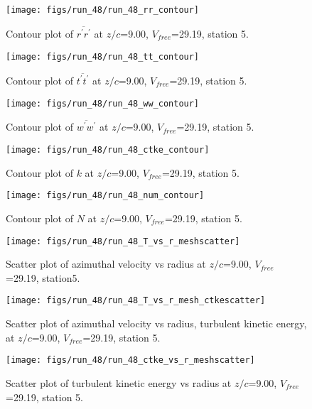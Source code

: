 \begin{figure}[H]
\centering
\texttt{[image: figs/run\_48/run\_48\_rr\_contour]}
\caption{Contour plot of $\overline{r^\prime r^\prime}$ at $z/c$=9.00, $V_{free}$=29.19, station 5.}
\label{fig:run_48_rr_contour}
\end{figure}


\begin{figure}[H]
\centering
\texttt{[image: figs/run\_48/run\_48\_tt\_contour]}
\caption{Contour plot of $\overline{t^\prime t^\prime}$ at $z/c$=9.00, $V_{free}$=29.19, station 5.}
\label{fig:run_48_tt_contour}
\end{figure}


\begin{figure}[H]
\centering
\texttt{[image: figs/run\_48/run\_48\_ww\_contour]}
\caption{Contour plot of $\overline{w^\prime w^\prime}$ at $z/c$=9.00, $V_{free}$=29.19, station 5.}
\label{fig:run_48_ww_contour}
\end{figure}


\begin{figure}[H]
\centering
\texttt{[image: figs/run\_48/run\_48\_ctke\_contour]}
\caption{Contour plot of $k$ at $z/c$=9.00, $V_{free}$=29.19, station 5.}
\label{fig:run_48_ctke_contour}
\end{figure}


\begin{figure}[H]
\centering
\texttt{[image: figs/run\_48/run\_48\_num\_contour]}
\caption{Contour plot of $N$ at $z/c$=9.00, $V_{free}$=29.19, station 5.}
\label{fig:run_48_num_contour}
\end{figure}


\begin{figure}[H]
\centering
\texttt{[image: figs/run\_48/run\_48\_T\_vs\_r\_meshscatter]}
\caption{Scatter plot of azimuthal velocity vs radius at $z/c$=9.00, $V_{free}$=29.19, station5.}
\label{fig:run_48_T_vs_r_meshscatter}
\end{figure}


\begin{figure}[H]
\centering
\texttt{[image: figs/run\_48/run\_48\_T\_vs\_r\_mesh\_ctkescatter]}
\caption{Scatter plot of azimuthal velocity vs radius, turbulent kinetic energy, at $z/c$=9.00, $V_{free}$=29.19, station 5.}
\label{fig:run_48_T_vs_r_mesh_ctkescatter}
\end{figure}


\begin{figure}[H]
\centering
\texttt{[image: figs/run\_48/run\_48\_ctke\_vs\_r\_meshscatter]}
\caption{Scatter plot of turbulent kinetic energy vs radius at $z/c$=9.00, $V_{free}$=29.19, station 5.}
\label{fig:run_48_ctke_vs_r_meshscatter}
\end{figure}


